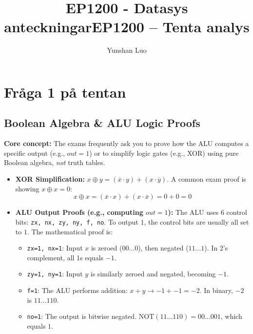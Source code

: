 \documentclass[12pt,a4paper]{article}
\title{EP1200 - Datasys anteckningar}
\author{Yunshan Luo}
\begin{document}
\title{EP1200 -- Tenta analys}
\maketitle
\newpage
\tableofcontents
\newpage
\section{Fråga 1 på tentan}
\subsection{Boolean Algebra \& ALU Logic Proofs}
\textbf{Core concept:} The exams frequently ask you to prove how the ALU computes a specific output (e.g., $out = 1$) or to simplify logic gates (e.g., XOR) using pure Boolean algebra, \textit{not} truth tables.
\begin{itemize}
    \item \textbf{XOR Simplification:} 
    $x \oplus y = (\overline{x} \cdot y) + (x \cdot \overline{y})$. 
    A common exam proof is showing $x \oplus x = 0$:
    $$x \oplus x = (\overline{x} \cdot x) + (x \cdot \overline{x}) = 0 + 0 = 0$$
    \item \textbf{ALU Output Proofs (e.g., computing $out = 1$):}
    The ALU uses 6 control bits: \texttt{zx, nx, zy, ny, f, no}. To output $1$, the control bits are usually all set to $1$. The mathematical proof is:
    \begin{itemize}
        \item \texttt{zx=1, nx=1}: Input $x$ is zeroed ($00\dots0$), then negated ($11\dots1$). In 2's complement, all 1s equals $-1$.
        \item \texttt{zy=1, ny=1}: Input $y$ is similarly zeroed and negated, becoming $-1$.
        \item \texttt{f=1}: The ALU performs addition: $x + y \rightarrow -1 + -1 = -2$. In binary, $-2$ is $11\dots110$.
        \item \texttt{no=1}: The output is bitwise negated. $\text{NOT}(11\dots110) = 00\dots001$, which equals $1$.
    \end{itemize}
\end{itemize}
\end{document}
